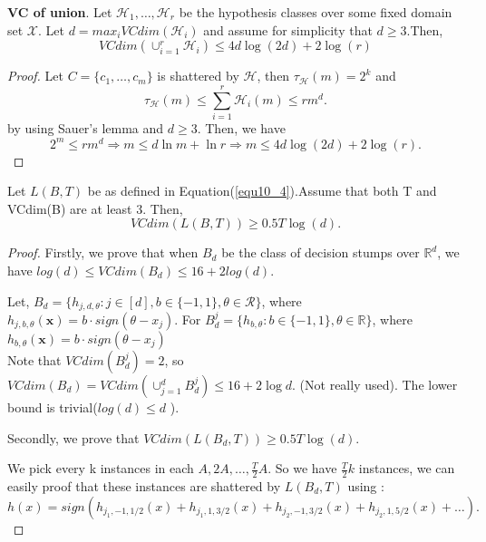 \begin{thm}
	\label{exec6_11}
	\textbf{VC of union}. Let $\mathcal{H}_1,\dots, \mathcal{H}_r$ be the hypothesis classes
	over some fixed domain set $\mathcal{X}$. Let $d=max_iVCdim(\mathcal{H}_i)$ and
	assume for simplicity that $d \ge 3$.Then,
	\begin{equation}
		VCdim(\cup^r_{i=1}\mathcal{H}_i) \le 4d\log(2d) + 2\log(r)
	\end{equation}
\end{thm}
\begin{proof}
	Let $C = \{ c_1, \dots, c_m \} $ is shattered by $\mathcal{H}$, then 
	$\tau_\mathcal{H}(m) = 2^k$ and  
	\[
		\tau_\mathcal{H}(m) \le \sum\limits^r_{i=1} \mathcal{H}_i(m)
		\le rm^d
	.\]
	by using Sauer's lemma and $d \ge 3$. Then, we have 
	\[
		2^m \le rm^d \Rightarrow m \le d \ln m + \ln r \Rightarrow m \le 4d\log(2d)+2\log(r)	
	.\]
\end{proof}

\begin{lem}
	Let $L(B,T)$ be as defined in Equation(\ref{equ10_4}).Assume that both T and
	VCdim(B) are at least 3. Then,
	\[
		VCdim(L(B,T)) \ge 0.5T \log(d)
	.\]	
\end{lem}
\begin{proof}
	Firstly, we prove that when $B_d$ be the class of decision stumps over $\mathbb R^d$,
	we have $log(d) \le VCdim(B_d) \le 16 + 2log(d)$.

	Let, $B_d = \{ h_{j,d,\theta} : j \in [d], b\in \{ -1,1 \} , \theta \in \mathcal{R} \} $, where
	$h_{j,b,\theta}(\mathbf x) = b \cdot sign(\theta - x_j)$.
	For $B^j_d = \{ h_{b,\theta} : b \in \{ -1, 1 \} , \theta \in \mathbb{R} \} $, where
	$h_{b, \theta}(\mathbf{x}) = b \cdot sign(\theta - x_j)$\\
	Note that $VCdim(B^j_d) = 2$, so $VCdim(B_d) = VCdim(\cup^d_{j=1} B_d^j) \le 16 + 2\log d$.
	(Not really used).
	The lower bound is trivial($log(d) \le d$ ).

	Secondly, we prove that $VCdim(L(B_d,T)) \ge 0.5T \log(d)$.

	We pick every k instances in each  $A, 2A, \dots, \frac{T}{2}A$. So we have $\frac{T}{2}k$ 
	instances, we can easily proof that these instances are shattered by $L(B_d,T)$ using :
	\[
		h(x) = sign\left( h_{j_1,-1,1/2}(x) + h_{j_1, 1,3/2}(x) + 
		h_{j_2, -1, 3/2}(x) + h_{j_2, 1, 5/2}(x) + \dots \right)
	.\]
\end{proof}


